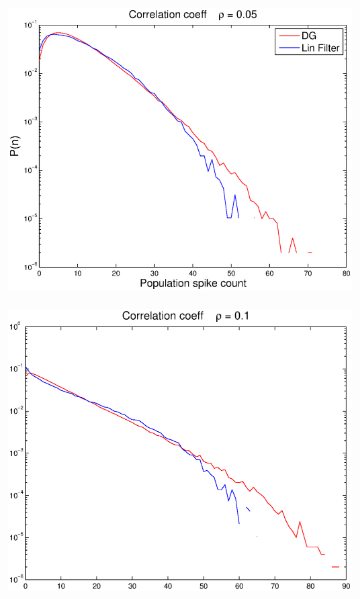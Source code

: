 \documentclass[11pt]{article}
\begin{document}
\begin{figure}[H]
	\centering
	\begin{subfigure}[h]{0.49\textwidth}
	\centering
	\includegraphics[width=\textwidth]{../Figures/Lin_Filter/Filt_DG_indiv_mu_01_rho_05_gamma_changed}
	\label{fig11}
	\end{subfigure}
	\begin{subfigure}[h]{0.49\textwidth}
	\centering
	\includegraphics[width=\textwidth]{../Figures/Lin_Filter/Filt_DG_indiv_mu_01_rho_1_gamma_changed}
	\label{fig11}
	\end{subfigure}\\

\end{figure}
\end{document}
